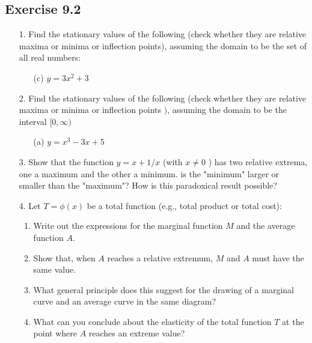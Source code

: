 \documentclass{./../../Latex/homework}
\begin{document}
\thispagestyle{plain}

\subsection*{Exercise 9.2}

\begin{enumerate}

\item[1.] Find the stationary values of the following (check whether they are relative maxima or minima or inflection points), assuming the domain to be the set of all real numbers:
\begin{itemize}
\item[(c)] $y=3 x^{2}+3$
\end{itemize}

\item[2.] Find the stationary values of the following (check whether they are relative maxima or minima or inflection points $)$, assuming the domain to be the interval $[0, \infty)$ 
\begin{itemize}
\item[(a)] $y=x^{3}-3 x+5$
\end{itemize}

\item[3.] Show that the function $y=x+1 / x$ (with $x \neq 0$ ) has two relative extrema, one a maximum and the other a minimum. is the "minimum" larger or smaller than the "maximum"? How is this paradoxical result possible?

\item[4.] Let $T=\phi(x)$ be a total function (e.g., total product or total cost):
\begin{enumerate}
  \item Write out the expressions for the marginal function $M$ and the average function $A$.
  \item Show that, when $A$ reaches a relative extremum, $M$ and $A$ must have the same value.
  \item What general principle does this suggest for the drawing of a marginal curve and an average curve in the same diagram?
  \item What can you conclude about the elasticity of the total function $T$ at the point where $A$ reaches an extreme value?
\end{enumerate}


\end{enumerate}
\end{document}
